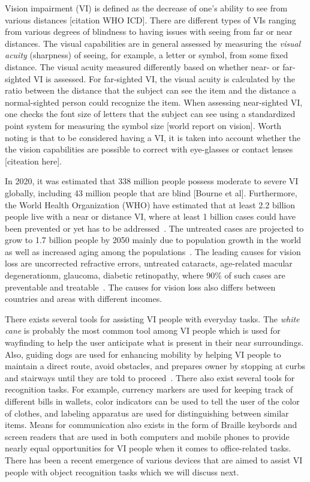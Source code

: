 Vision impairment (VI) is defined as the decrease of one's ability to see from various distances [citation WHO ICD]. There are different types of VIs ranging from various degrees of blindness to having issues with seeing from far or near distances. The visual capabilities are in general assessed by measuring the \textit{visual acuity} (sharpness) of seeing, for example, a letter or symbol, from some fixed distance. The visual acuity measured differently based on whether near- or far-sighted VI is assessed. For far-sighted VI, the visual acuity is calculated by the ratio between the distance that the subject can see the item and the distance a normal-sighted person could recognize the item. When assessing near-sighted VI, one checks the font size of letters that the subject can see using a standardized point system for measuring the symbol size [world report on vision]. Worth noting is that to be considered having a VI, it is taken into account whether the the vision capabilities are possible to correct with eye-glasses or contact lenses [citeation here].   

In 2020, it was estimated that 338 million people possess moderate to severe VI globally, including 43 million people that are blind [Bourne et al]. 
Furthermore, the World Health Organization (WHO) have estimated that at least 2.2 billion people live with a near or distance VI, where at least 1 billion cases could have been prevented or yet has to be addressed~\cite{who2019world}. The untreated cases are projected to grow to 1.7 billion people by 2050 mainly due to population growth in the world as well as increased aging among the populations~\cite{bourne2021trends}. 
The leading causes for vision loss are uncorrected refractive errors, untreated cataracts, age-related macular degenerationm, glaucoma, diabetic retinopathy, where 90\% of such cases are preventable and treatable~\cite{steinmetz2021causes}. The causes for vision loss also differs between countries and areas with different incomes.  

There exists several tools for assisting VI people with everyday tasks. The \textit{white cane} is probably the most common tool among VI people which is used for wayfinding to help the user anticipate what is present in their near surroundings. Also, guiding dogs are used for enhancing mobility by helping VI people to maintain a direct route, avoid obstacles, and prepares owner by stopping at curbs and stairways until they are told to proceed~\cite{manduchi2012computer}. There also exist several tools for recognition tasks. For example, currency markers are used for keeping track of different bills in wallets, color indicators can be used to tell the user of the color of clothes, and labeling apparatus are used for distinguishing between similar items. Means for communication also exists in the form of Braille keybords and screen readers that are used in both computers and mobile phones to provide nearly equal opportunities for VI people when it comes to office-related tasks. There has been a recent emergence of various devices that are aimed to assist VI people with object recognition tasks which we will discuss next.  




